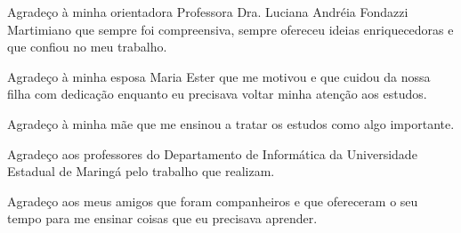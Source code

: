 
\begin{agradecimentos}
Agradeço à minha orientadora Professora Dra. Luciana Andréia Fondazzi Martimiano que sempre foi compreensiva, sempre ofereceu ideias enriquecedoras e que confiou no meu trabalho.

Agradeço à minha esposa Maria Ester que me motivou e que cuidou da nossa filha com dedicação enquanto eu precisava voltar minha atenção aos estudos.

Agradeço à minha mãe que me ensinou a tratar os estudos como algo importante.

Agradeço aos professores do Departamento de Informática da Universidade Estadual de Maringá pelo trabalho que realizam.

Agradeço aos meus amigos que foram companheiros e que ofereceram o seu tempo para me ensinar coisas que eu precisava aprender. 
\end{agradecimentos}
